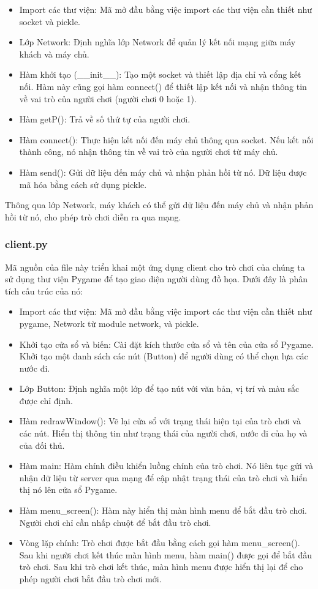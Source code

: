 \documentclass[a4paper]{article}
\begin{document}
\begin{itemize}
    \item Import các thư viện: Mã mở đầu bằng việc import các thư viện cần thiết như socket và pickle.
    \item Lớp Network: Định nghĩa lớp Network để quản lý kết nối mạng giữa máy khách và máy chủ.
    \item Hàm khởi tạo (\_\_init\_\_): Tạo một socket và thiết lập địa chỉ và cổng kết nối. Hàm này cũng gọi hàm connect() để thiết lập kết nối và nhận thông tin về vai trò của người chơi (người chơi 0 hoặc 1).
    \item Hàm getP(): Trả về số thứ tự của người chơi.
    \item Hàm connect(): Thực hiện kết nối đến máy chủ thông qua socket. Nếu kết nối thành công, nó nhận thông tin về vai trò của người chơi từ máy chủ.
    \item Hàm send(): Gửi dữ liệu đến máy chủ và nhận phản hồi từ nó. Dữ liệu được mã hóa bằng cách sử dụng pickle.
\end{itemize}
Thông qua lớp Network, máy khách có thể gửi dữ liệu đến máy chủ và nhận phản hồi từ nó, cho phép trò chơi diễn ra qua mạng.
\subsubsection{client.py}
Mã nguồn của file này triển khai một ứng dụng client cho trò chơi của chúng ta sử dụng thư viện Pygame để tạo giao diện người dùng đồ họa. Dưới đây là phân tích cấu trúc của nó:

\begin{itemize}
    \item Import các thư viện: Mã mở đầu bằng việc import các thư viện cần thiết như pygame, Network từ module network, và pickle.
    \item Khởi tạo cửa sổ và biến: Cài đặt kích thước cửa sổ và tên của cửa sổ Pygame. Khởi tạo một danh sách các nút (Button) để người dùng có thể chọn lựa các nước đi.
    \item Lớp Button: Định nghĩa một lớp để tạo nút với văn bản, vị trí và màu sắc được chỉ định.
    \item Hàm redrawWindow(): Vẽ lại cửa sổ với trạng thái hiện tại của trò chơi và các nút. Hiển thị thông tin như trạng thái của người chơi, nước đi của họ và của đối thủ.
    \item Hàm main: Hàm chính điều khiển luồng chính của trò chơi. Nó liên tục gửi và nhận dữ liệu từ server qua mạng để cập nhật trạng thái của trò chơi và hiển thị nó lên cửa sổ Pygame.
    \item Hàm menu\_screen(): Hàm này hiển thị màn hình menu để bắt đầu trò chơi. Người chơi chỉ cần nhấp chuột để bắt đầu trò chơi.
    \item Vòng lặp chính: Trò chơi được bắt đầu bằng cách gọi hàm menu\_screen(). Sau khi người chơi kết thúc màn hình menu, hàm main() được gọi để bắt đầu trò chơi. Sau khi trò chơi kết thúc, màn hình menu được hiển thị lại để cho phép người chơi bắt đầu trò chơi mới.
\end{itemize}
\end{document}
